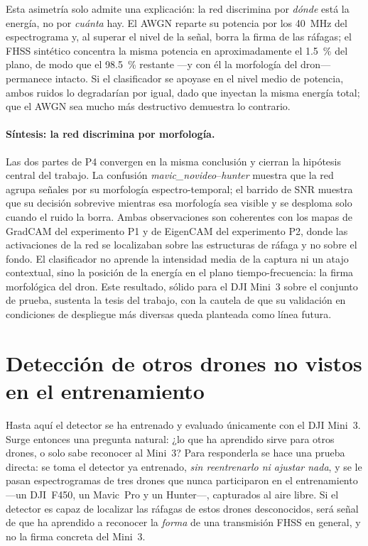 Esta asimetría solo admite una explicación: la red discrimina por \emph{dónde} está la energía, no por \emph{cuánta} hay. El AWGN reparte su potencia por los \SI{40}{\mega\hertz} del espectrograma y, al superar el nivel de la señal, borra la firma de las ráfagas; el FHSS sintético concentra la misma potencia en aproximadamente el \SI{1,5}{\percent} del plano, de modo que el \SI{98,5}{\percent} restante ---y con él la morfología del dron--- permanece intacto. Si el clasificador se apoyase en el nivel medio de potencia, ambos ruidos lo degradarían por igual, dado que inyectan la misma energía total; que el AWGN sea mucho más destructivo demuestra lo contrario.

\paragraph{Síntesis: la red discrimina por morfología.}
Las dos partes de P4 convergen en la misma conclusión y cierran la hipótesis central del trabajo. La confusión \emph{mavic\_novideo}--\emph{hunter} muestra que la red agrupa señales por su morfología espectro-temporal; el barrido de SNR muestra que su decisión sobrevive mientras esa morfología sea visible y se desploma solo cuando el ruido la borra. Ambas observaciones son coherentes con los mapas de GradCAM del experimento P1 y de EigenCAM del experimento P2, donde las activaciones de la red se localizaban sobre las estructuras de ráfaga y no sobre el fondo. El clasificador no aprende la intensidad media de la captura ni un atajo contextual, sino la posición de la energía en el plano tiempo-frecuencia: la firma morfológica del dron. Este resultado, sólido para el DJI Mini~3 sobre el conjunto de prueba, sustenta la tesis del trabajo, con la cautela de que su validación en condiciones de despliegue más diversas queda planteada como línea futura.


\section{Detección de otros drones no vistos en el entrenamiento}
\label{sec:zeroshot}

Hasta aquí el detector se ha entrenado y evaluado únicamente con el DJI Mini~3. Surge entonces una pregunta natural: ¿lo que ha aprendido sirve para otros drones, o solo sabe reconocer al Mini~3? Para responderla se hace una prueba directa: se toma el detector ya entrenado, \emph{sin reentrenarlo ni ajustar nada}, y se le pasan espectrogramas de tres drones que nunca participaron en el entrenamiento ---un DJI~F450, un Mavic~Pro y un Hunter---, capturados al aire libre. Si el detector es capaz de localizar las ráfagas de estos drones desconocidos, será señal de que ha aprendido a reconocer la \emph{forma} de una transmisión FHSS en general, y no la firma concreta del Mini~3.

